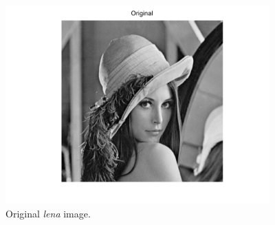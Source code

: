\documentclass[11pt]{article}
\begin{document}
\begin{figure}[H]
	\centering
	\includegraphics[trim=0.5in 0.3in 0.5in 0in, width=4in]{Fig_Lena_Original.png}
	\caption{Original \textit{lena} image.}
	\label{Fig_Lena_Original}
\end{figure}
\end{document}
